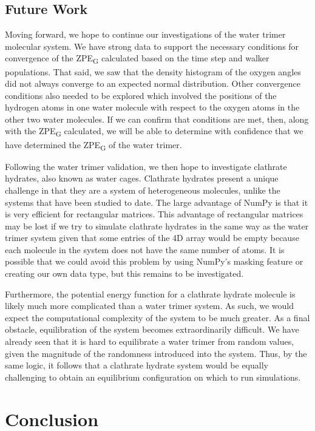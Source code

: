 \documentclass[journal=jacsat,manuscript=article]{achemso}
\begin{document}
\subsection{Future Work}

Moving forward, we hope to continue our investigations of the water trimer molecular system. We have strong data to support the necessary conditions for convergence of the ZPE\textsubscript{G} calculated based on the time step and walker populations. That said, we saw that the density histogram of the oxygen angles did not always converge to an expected normal distribution. Other convergence conditions also needed to be explored which involved the positions of the hydrogen atoms in one water molecule with respect to the oxygen atoms in the other two water molecules. If we can confirm that conditions are met, then, along with the ZPE\textsubscript{G} calculated, we will be able to determine with confidence that we have determined the ZPE\textsubscript{G} of the water trimer. 

Following the water trimer validation, we then hope to investigate clathrate hydrates\cite{Englezos1993}, also known as water cages. Clathrate hydrates present a unique challenge in that they are a system of heterogeneous molecules, unlike the systems that have been studied to date. The large advantage of NumPy is that it is very efficient for rectangular matrices. This advantage of rectangular matrices may be lost if we try to simulate clathrate hydrates in the same way as the water trimer system given that some entries of the 4D array would be empty because each molecule in the system does not have the same number of atoms. It is possible that we could avoid this problem by using NumPy’s masking feature or creating our own data type, but this remains to be investigated. 

Furthermore, the potential energy function for a clathrate hydrate molecule is likely much more complicated than a water trimer system. As such, we would expect the computational complexity of the system to be much greater. As a final obstacle, equilibration of the system becomes extraordinarily difficult. We have already seen that it is hard to equilibrate a water trimer from random values, given the magnitude of the randomness introduced into the system. Thus, by the same logic, it follows that a clathrate hydrate system would be equally challenging to obtain an equilibrium configuration on which to run simulations.

\section{Conclusion}
\end{document}
